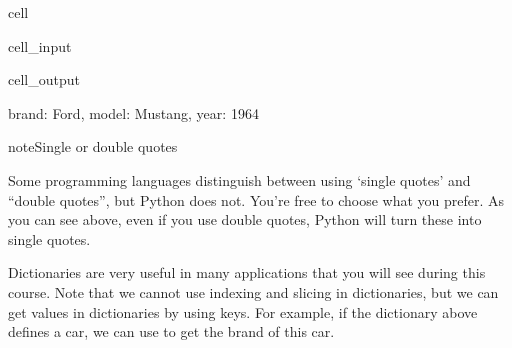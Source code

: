 \documentclass[letterpaper,10pt,english]{jupyterBook}
\begin{document}
\begin{sphinxuseclass}{cell}\begin{sphinxVerbatimInput}

\begin{sphinxuseclass}{cell_input}
\begin{sphinxVerbatim}[commandchars=\\\{\}]
       
\end{sphinxVerbatim}

\end{sphinxuseclass}\end{sphinxVerbatimInput}
\begin{sphinxVerbatimOutput}

\begin{sphinxuseclass}{cell_output}
\begin{sphinxVerbatim}[commandchars=\\\{\}]
\PYGZob{}\PYGZsq{}brand\PYGZsq{}: \PYGZsq{}Ford\PYGZsq{}, \PYGZsq{}model\PYGZsq{}: \PYGZsq{}Mustang\PYGZsq{}, \PYGZsq{}year\PYGZsq{}: 1964\PYGZcb{}
\end{sphinxVerbatim}

\end{sphinxuseclass}\end{sphinxVerbatimOutput}

\end{sphinxuseclass}
\begin{sphinxadmonition}{note}{Single or double quotes}

\sphinxAtStartPar
Some programming languages distinguish between using ‘single quotes’ and “double quotes”, but Python does not. You’re free to choose what you prefer. As you can see above, even if you use double quotes, Python will turn these into single quotes.
\end{sphinxadmonition}

\sphinxAtStartPar
Dictionaries are very useful in many applications that you will see during this course. Note that we cannot use indexing and slicing in dictionaries, but we can get values in dictionaries by using keys. For example, if the dictionary above defines a car, we can use  to get the brand of this car.
\end{document}
